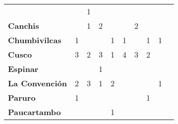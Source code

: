 \begin{tabular}{lccccccccc}
 	& \cellcolor[HTML]{FCC46C}                 &1                                 &\cellcolor[HTML]{FCC46C} 				& \cellcolor[HTML]{FCC46C}                   & \cellcolor[HTML]{FCC46C}\\
	\textbf{Canchis}                           & \cellcolor[HTML]{FCC46C}  
	& 1                 &2                     & \cellcolor[HTML]{FCC46C}                   								& \cellcolor[HTML]{FCC46C}                   &2                  				  & \cellcolor[HTML]{FCC46C}                   & \cellcolor[HTML]{FCC46C} 				   & \cellcolor[HTML]{FCC46C} \\
	\textbf{Chumbivilcas}                      &1                 				  & \cellcolor[HTML]{FCC46C}                   & \cellcolor[HTML]{FCC46C}                   &1                    &1                                       				& \cellcolor[HTML]{FCC46C}                   &1            &1    				& \cellcolor[HTML]{FCC46C} \\
	\textbf{Cusco}                             &3 				     &2                  &3                    				& 1                                          &4                    &3                  &2                 &\cellcolor[HTML]{FCC46C}    			   & \cellcolor[HTML]{FCC46C} \\
	\textbf{Espinar}       					   & \cellcolor[HTML]{FCC46C}  			   &\cellcolor[HTML]{FCC46C}                  & 1                						   & \cellcolor[HTML]{FCC46C}              &\cellcolor[HTML]{FCC46C}                  & \cellcolor[HTML]{FCC46C}                 &\cellcolor[HTML]{FCC46C}                  & \cellcolor[HTML]{FCC46C}  			   &\cellcolor[HTML]{FCC46C}\\
	\textbf{La Convención}                     &2 				 	&3                                            &1                     					   &2                   &\cellcolor[HTML]{FCC46C}               				& \cellcolor[HTML]{FCC46C}                   &\cellcolor[HTML]{FCC46C}               &1 									& \cellcolor[HTML]{FCC46C}\\
	\textbf{Paruro}                            & 1 					&\cellcolor[HTML]{FCC46C}                     			& \cellcolor[HTML]{FCC46C}              	   &\cellcolor[HTML]{FCC46C}                     								& \cellcolor[HTML]{FCC46C}              	   &\cellcolor[HTML]{FCC46C}                     &1                   				  	   &\cellcolor[HTML]{FCC46C}   													& \cellcolor[HTML]{FCC46C} \\
	\textbf{Paucartambo}               		   &\cellcolor[HTML]{FCC46C}  													& \cellcolor[HTML]{FCC46C}                   & \cellcolor[HTML]{FCC46C}                      & 1                          & \cellcolor[HTML]{FCC46C}                   & \cellcolor[HTML]{FCC46C}                      & \cellcolor[HTML]{FCC46C}                   & \cellcolor[HTML]{FCC46C} 					   & \cellcolor[HTML]{FCC46C}\\

\end{tabular}
